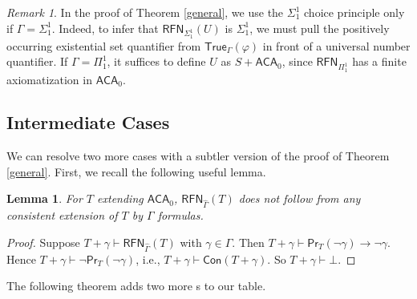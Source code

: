 \documentclass{amsart}
\newcommand{\xmark}{\ding{55}}%
\newtheorem{lemma}[theorem]{Lemma}
\theoremstyle{definition}
\theoremstyle{remark}
\newtheorem{remark}[theorem]{Remark}
\begin{document}
\begin{remark}
    In the proof of Theorem \ref{general}, we use the $\Sigma^1_1$ choice principle only if $\Gamma=\Sigma^1_1$. Indeed, to infer that $\mathsf{RFN}_{\Sigma^1_1}(U)$ is $\Sigma^1_1$, we must pull the positively occurring existential set quantifier from $\mathsf{True}_\Gamma(\varphi)$ in front of a universal number quantifier. If $\Gamma=\Pi^1_1$, it suffices to define $U$ as $S+\mathsf{ACA}_0$, since $\mathsf{RFN}_{\Pi^1_1}$ has a finite axiomatization in $\mathsf{ACA}_0$.
\end{remark}



\subsection{Intermediate Cases}

We can resolve two more cases with a subtler version of the proof of Theorem \ref{general}. First, we recall the following useful lemma.

\begin{lemma}\label{reflection}
For $T$ extending $\mathsf{ACA}_0$, $\mathsf{RFN}_{\widehat\Gamma}(T)$ does not follow from any consistent extension of $T$ by $\Gamma$ formulas.
\end{lemma}
\begin{proof}
    Suppose $T+\gamma \vdash \mathsf{RFN}_{\widehat\Gamma}(T)$ with $\gamma\in\Gamma$. Then $T+\gamma \vdash \mathsf{Pr}_T(\neg \gamma)\to \neg \gamma$. Hence $T+\gamma \vdash \neg \mathsf{Pr}_T(\neg \gamma)$, i.e., $T+\gamma \vdash \mathsf{Con}(T+\gamma)$. So $T+\gamma\vdash \bot$.
\end{proof}


The following theorem adds two more \xmark s to our table.
\end{document}

